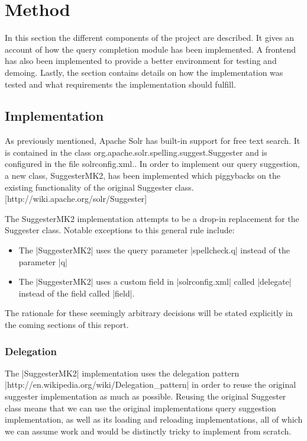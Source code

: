 \section{Method}\label{method}

In this section the different components of the project are described. It gives an account of how the query completion module has been implemented. A frontend has also been implemented to provide a better environment for testing and demoing. Lastly, the section contains details on how the implementation was tested and what requirements the implementation should fulfill. 

\subsection{Implementation}

As previously mentioned, Apache Solr has built-in support for free text search. It is contained in the class org.apache.solr.spelling.suggest.Suggester and is configured in the file solrconfig.xml.. In order to implement our query suggestion, a new class, SuggesterMK2, has been implemented which piggybacks on the existing functionality of the original Suggester class.
[http://wiki.apache.org/solr/Suggester]

The SuggesterMK2 implementation attempts to be a drop-in replacement for the Suggester class. Notable exceptions to this general rule include:
\begin{itemize}

\item The |SuggesterMK2| uses the query parameter |spellcheck.q| instead of the parameter |q|
\item The |SuggesterMK2| uses a custom field in |solrconfig.xml| called |delegate| instead of the field called |field|.
\end{itemize}

The rationale for these seemingly arbitrary decisions will be stated explicitly in the coming sections of this report.

\subsubsection{Delegation}

The |SuggesterMK2| implementation uses the delegation pattern |http://en.wikipedia.org/wiki/Delegation_pattern| in order to reuse the original suggester implementation as much as possible. Reusing the original Suggester class means that we can use the original implementations query suggestion implementation, as well as its loading and reloading implementations, all of which we can assume work and would be distinctly tricky to implement from scratch.

